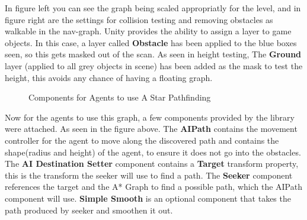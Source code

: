 \documentclass[11pt]{report}
\begin{document}
In figure left you can see the graph being scaled appropriatly for the level, and in figure right are the settings for collision testing and removing obstacles as walkable in the nav-graph. Unity provides the ability to assign a layer to game objects. In this case, a layer called \textbf{Obstacle} has been applied to the blue boxes seen, so this gets masked out of the scan. As seen in height testing, The \textbf{Ground} layer (applied to all grey objects in scene) has been added as the mask to test the height, this avoids any chance of having a floating graph.

\begin{figure}[H]
    \centering
    \caption{Components for Agents to use A Star Pathfinding}
\end{figure}

Now for the agents to use this graph, a few components provided by the library were attached. As seen in the figure above. The \textbf{AIPath} contains the movement controller for the agent to move along the discovered path and contains the shape(radius and height) of the agent, to ensure it does not go into the obstacles. The \textbf{AI Destination Setter} component contains a \textbf{Target} transform property, this is the transform the seeker will use to find a path. The \textbf{Seeker} component references the target and the A* Graph to find a possible path, which the AIPath component will use. \textbf{Simple Smooth} is an optional component that takes the path produced by seeker and smoothen it out.
\end{document}
